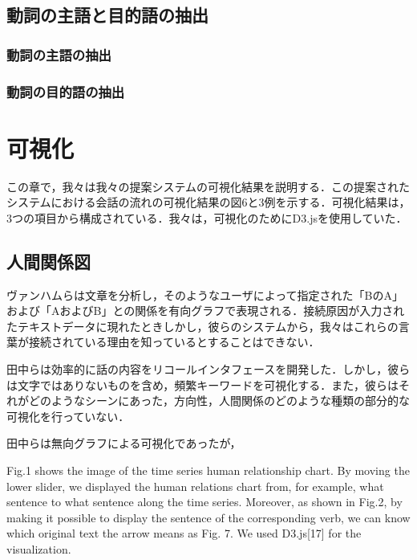 \documentclass[shuuron]{kuee}
\begin{document}
  \subsection{動詞の主語と目的語の抽出}

\subsubsection{動詞の主語の抽出}
\subsubsection{動詞の目的語の抽出}



\section{可視化}

この章で，我々は我々の提案システムの可視化結果を説明する．この提案されたシステムにおける会話の流れの可視化結果の図6と3例を示する．可視化結果は，3つの項目から構成されている．我々は，可視化のためにD3.js\cite{vand3}を使用していた．%



\subsection{人間関係図}

ヴァンハムら\cite{van2009mapping}は文章を分析し，そのようなユーザによって指定された「BのA」および「AおよびB」との関係を有向グラフで表現される．接続原因が入力されたテキストデータに現れたときしかし，彼らのシステムから，我々はこれらの言葉が接続されている理由を知っているとすることはできない．

田中ら\cite{tanaka}は効率的に話の内容をリコールインタフェースを開発した．しかし，彼らは文字ではありないものを含め，頻繁キーワードを可視化する．また，彼らはそれがどのようなシーンにあった，方向性，人間関係のどのような種類の部分的な可視化を行っていない．

田中らは無向グラフによる可視化であったが，

  Fig.1 shows the image of the time series human relationship chart. By moving the lower slider, we displayed the human relations chart from, for example, what sentence to what sentence along the time series. Moreover, as shown in Fig.2, by making it possible to display the sentence of the corresponding verb, we can know which original text the arrow means as Fig. 7. We used D3.js[17] for the visualization.
\end{document}
